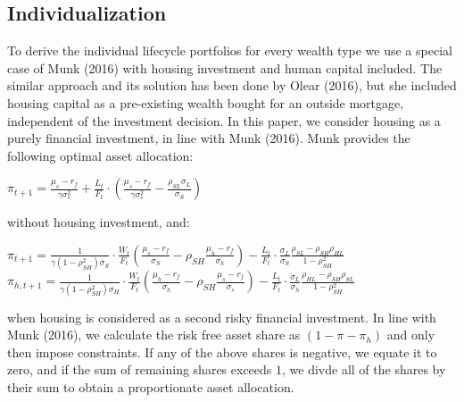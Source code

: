 \documentclass[]{elsarticle}
\begin{document}


\subsection{Individualization}

To derive the individual lifecycle portfolios for every wealth type we use a special case of Munk (2016) with housing investment and human capital included. The similar approach and its solution has been done by Olear (2016), but she included housing capital as a pre-existing wealth bought for an outside mortgage, independent of the investment decision. In this paper, we consider housing as a purely financial investment, in line with Munk (2016). Munk provides the following optimal asset allocation:


\begin{center}
	$\pi_{t+1} = \frac{\mu_s - r_f}{\gamma \sigma^2_s}  + \frac{L_t}{F_t} \cdot \left(\frac{\mu_s - r_f}{\gamma \sigma^2_s} - \frac{\rho_{SL}\sigma_L}{\sigma_S} \right)$
\end{center}

without housing investment, and:

\begin{center}
	$\pi_{t+1} = \frac{1}{\gamma (1 - \rho^2_{SH}) \sigma_S} \cdot \frac{W_t}{F_t} \left( \frac{\mu_s - r_f}{\sigma_S} - \rho_{SH} \frac{\mu_h - r_f}{\sigma_h} \right) - \frac{L_t}{F_t} \cdot \frac{\sigma_L}{\sigma_S} \frac{\rho_{SL} - \rho_{SH}\rho_{HL}}{1 - \rho^2_{SH}}$\\
	$\pi_{h,t+1} = \frac{1}{\gamma (1 - \rho^2_{SH}) \sigma_H} \cdot \frac{W_t}{F_t} \left( \frac{\mu_h - r_f}{\sigma_h} - \rho_{SH} \frac{\mu_s - r_f}{\sigma_s} \right) - \frac{L_t}{F_t} \cdot \frac{\sigma_L}{\sigma_h} \frac{\rho_{HL} - \rho_{SH}\rho_{SL}}{1 - \rho^2_{SH}}$
\end{center}

when housing is considered as a second risky financial investment. In line with Munk (2016), we calculate the risk free asset share as $\left( 1 - \pi - \pi_h \right)$ and only then impose constraints. If any of the above shares is negative, we equate it to zero, and if the sum of remaining shares exceeds $1$, we divde all of the shares by their sum to obtain a proportionate asset allocation. 
\end{document}

